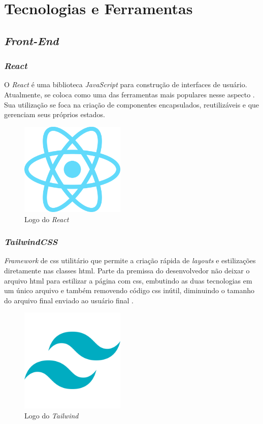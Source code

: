 \section{Tecnologias e Ferramentas} 

\subsection{\emph{Front-End}} 

\subsubsection{\emph{React}} 
O \emph{React} \cite{react} é uma biblioteca \emph{JavaScript} para construção de interfaces de usuário. Atualmente, se coloca como uma das ferramentas mais populares nesse aspecto \cite{state-of-front-end}. Sua utilização se foca na criação de componentes encapsulados, reutilizáveis e que gerenciam seus próprios estados.

\begin{figure}[htb]
	\centering
	\includegraphics[width=5cm]{cap04-desenvolvimento/images/4-4-1-1-react}
	\caption{Logo do \emph{React}}
	\label{fig:logo_react}
\end{figure}
\FloatBarrier

\subsubsection{\emph{TailwindCSS}} 
\emph{Framework} de \gls{css} utilitário que permite a criação rápida de \emph{layouts} e estilizações diretamente nas classes \gls{html}. Parte da premissa do desenvolvedor não deixar o arquivo \gls{html} para estilizar a página com \gls{css}, embutindo as duas tecnologias em um único arquivo e também removendo código \gls{css} inútil, diminuindo o tamanho do arquivo final enviado ao usuário final \cite{tailwind}.

\begin{figure}[htb]
	\centering
	\includegraphics[width=5cm]{cap04-desenvolvimento/images/4-4-1-2-tailwindcss-logo.png}
	\caption{Logo do \emph{Tailwind}}
	\label{fig:logo_tailwind}
\end{figure}
\FloatBarrier

